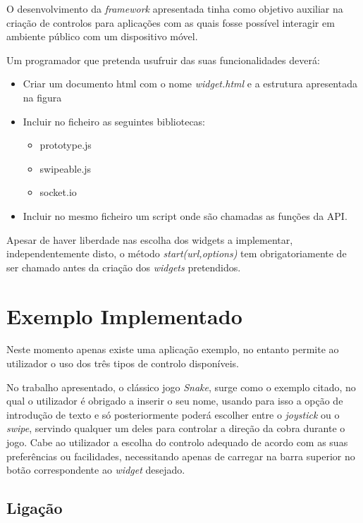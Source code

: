 	O desenvolvimento da \textit{framework} apresentada tinha como objetivo auxiliar na criação de controlos para aplicações com as quais fosse possível interagir em ambiente público com um dispositivo móvel.

	Um programador que pretenda usufruir das suas funcionalidades deverá:

	\begin{itemize}
		\item Criar um documento html com o nome \textit{widget.html} e a estrutura apresentada na figura 
		\item Incluir no ficheiro as seguintes bibliotecas:
			\begin{itemize}
			\item prototype.js 
			\item swipeable.js
			\item socket.io
			\end{itemize}
		\item Incluir no mesmo ficheiro um script onde são chamadas as funções da API.
	\end{itemize}

	Apesar de haver liberdade nas escolha dos widgets a implementar, independentemente disto, o método \textit{start(url,options)} tem obrigatoriamente de ser chamado antes da criação dos \textit{widgets} pretendidos. 


	
\section{Exemplo Implementado} \label{sec:exemplo}

	Neste momento apenas existe uma aplicação exemplo, no entanto permite ao utilizador o uso dos três tipos de controlo disponíveis. 

	No trabalho apresentado, o clássico jogo \textit{Snake}, surge como o exemplo citado, no qual o utilizador é obrigado a inserir o seu nome, usando para isso a opção de introdução de texto e só posteriormente poderá escolher entre o \textit{joystick} ou o \textit{swipe}, servindo qualquer um deles para controlar a direção da cobra durante o jogo. Cabe ao utilizador a escolha do controlo adequado de acordo com as suas preferências ou facilidades, necessitando apenas de carregar na barra superior no botão correspondente ao \textit{widget} desejado.

	\subsection{Ligação}


